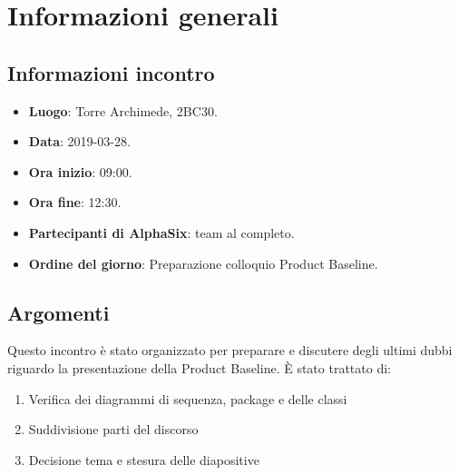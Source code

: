 \newcommand{\documento}{\VI}
\newcommand{\nomedocumentofisico}{VI\_2019-03-28.pdf}
\newcommand{\redazione}{\SG}
\newcommand{\verifica}{\CV}
\newcommand{\approvazione}{\NC}
\newcommand{\versione}{1.0.0}
\newcommand{\uso}{Interno}
\newcommand{\destinateTo}{\gruppo}
\newcommand{\datacreazione}{29 marzo 2019}
\newcommand{\datamodifica}{31 marzo 2019}
\newcommand{\stato}{Approvato}

\def\TABELLE{false}	%
\def\FIGURE{false} 	%






    

    	
    
    \section{Informazioni generali}
		\subsection{Informazioni incontro}
			\begin{itemize}
				\item \textbf{Luogo}: Torre Archimede, 2BC30.
				\item \textbf{Data}: 2019-03-28.
				\item \textbf{Ora inizio}: 09:00.
				\item \textbf{Ora fine}: 12:30.
				\item \textbf{Partecipanti di AlphaSix}: team al completo.
				\item \textbf{Ordine del giorno}: Preparazione colloquio Product Baseline.
			\end{itemize}

        \subsection{Argomenti}
            Questo incontro è stato organizzato per preparare e discutere degli ultimi dubbi riguardo la presentazione della Product Baseline. È stato trattato di:
            \begin{enumerate}
                \item Verifica dei diagrammi di sequenza, package e delle classi
                \item Suddivisione parti del discorso
                \item Decisione tema e stesura delle diapositive
            \end{enumerate}
            
